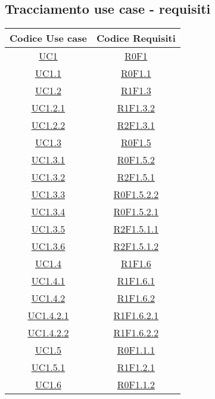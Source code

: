 \subsection{Tracciamento use case - requisiti}
\normalsize
\begin{longtable}{|c|c|}
	\hline
	\textbf{Codice Use case} & \textbf{Codice Requisiti} \\
	\hline
	\endhead
	\hyperlink{UC1}{UC1} & \hyperlink{R0F1}{R0F1}\\
	\hline
	\hyperlink{UC1.1}{UC1.1} & \hyperlink{R0F1.1}{R0F1.1}\\
	\hline
	\hyperlink{UC1.2}{UC1.2} & \hyperlink{R1F1.3}{R1F1.3}\\
	\hline
	\hyperlink{UC1.2.1}{UC1.2.1} & \hyperlink{R1F1.3.2}{R1F1.3.2}\\
	\hline
	\hyperlink{UC1.2.2}{UC1.2.2} & \hyperlink{R2F1.3.1}{R2F1.3.1}\\
	\hline
	\hyperlink{UC1.3}{UC1.3} & \hyperlink{R0F1.5}{R0F1.5}\\
	\hline
	\hyperlink{UC1.3.1}{UC1.3.1} & \hyperlink{R0F1.5.2}{R0F1.5.2}\\
	\hline
	\hyperlink{UC1.3.2}{UC1.3.2} & \hyperlink{R2F1.5.1}{R2F1.5.1}\\
	\hline
	\hyperlink{UC1.3.3}{UC1.3.3} & \hyperlink{R0F1.5.2.2}{R0F1.5.2.2}\\
	\hline
	\hyperlink{UC1.3.4}{UC1.3.4} & \hyperlink{R0F1.5.2.1}{R0F1.5.2.1}\\
	\hline
	\hyperlink{UC1.3.5}{UC1.3.5} & \hyperlink{R2F1.5.1.1}{R2F1.5.1.1}\\
	\hline
	\hyperlink{UC1.3.6}{UC1.3.6} & \hyperlink{R2F1.5.1.2}{R2F1.5.1.2}\\
	\hline
	\hyperlink{UC1.4}{UC1.4} & \hyperlink{R1F1.6}{R1F1.6}\\
	\hline
	\hyperlink{UC1.4.1}{UC1.4.1} & \hyperlink{R1F1.6.1}{R1F1.6.1}\\
	\hline
	\hyperlink{UC1.4.2}{UC1.4.2} & \hyperlink{R1F1.6.2}{R1F1.6.2}\\
	\hline
	\hyperlink{UC1.4.2.1}{UC1.4.2.1} & \hyperlink{R1F1.6.2.1}{R1F1.6.2.1}\\
	\hline
	\hyperlink{UC1.4.2.2}{UC1.4.2.2} & \hyperlink{R1F1.6.2.2}{R1F1.6.2.2}\\
	\hline
	\hyperlink{UC1.5}{UC1.5} & \hyperlink{R0F1.1.1}{R0F1.1.1}\\
	\hline
	\hyperlink{UC1.5.1}{UC1.5.1} & \hyperlink{R1F1.2.1}{R1F1.2.1}\\
	\hline
	\hyperlink{UC1.6}{UC1.6} & \hyperlink{R0F1.1.2}{R0F1.1.2}\\

\end{longtable}
